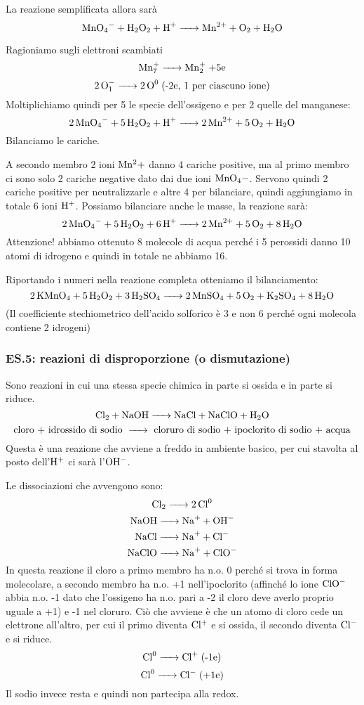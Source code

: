 La reazione semplificata allora sarà
$$\ce{MnO_4- + H_2O_2 + H+ -> Mn^2+ + O_2 + H_2O}$$

Ragioniamo sugli elettroni scambiati
$$\ce{Mn^+7 -> Mn^+2} \; \text{+5e}$$
$$\ce{2O^-1 -> 2O^0} \; \text{(-2e, 1 per ciascuno ione)}$$
Moltiplichiamo quindi per 5 le specie dell'ossigeno e per 2 quelle del manganese:
$$\ce{2MnO_4- + 5H_2O_2 + H+ -> 2Mn^2+ + 5O_2 + H_2O}$$
Bilanciamo le cariche.

A secondo membro 2 ioni $\rm Mn^2+$ danno 4 cariche positive, ma al primo membro ci sono solo 2 cariche negative dato dai due ioni $\rm MnO_4-$. Servono quindi 2 cariche positive per neutralizzarle e altre 4 per bilanciare, quindi aggiungiamo in totale 6 ioni $\rm H^+$. Possiamo bilanciare anche le masse, la reazione sarà:
$$\ce{2MnO_4- + 5H_2O_2 + 6H+ -> 2Mn^2+ + 5O_2 + 8H_2O}$$
Attenzione! abbiamo ottenuto 8 molecole di acqua perché i 5 perossidi danno 10 atomi di idrogeno e quindi in totale ne abbiamo 16.

Riportando i numeri nella reazione completa otteniamo il bilanciamento:
$$\ce{2KMnO_4 + 5H_2O_2 + 3H_2SO_4 -> 2MnSO_4 + 5O_2 + K_2SO_4 + 8H_2O}$$
(Il coefficiente stechiometrico dell'acido solforico è 3 e non 6 perché ogni molecola contiene 2 idrogeni)
\subsubsection{\textbf{ES.5: reazioni di disproporzione (o dismutazione)}}

Sono reazioni in cui una stessa specie chimica in parte si ossida e in parte si riduce.
$$\ce{Cl_2 + NaOH -> NaCl + NaClO + H_2O}$$
$$\text{cloro + idrossido di sodio \ce{->} cloruro di sodio + ipoclorito di sodio + acqua}$$
Questa è una reazione che avviene a freddo in ambiente basico, per cui stavolta al posto dell'$\rm H^+$ ci sarà l'$\rm OH^-$.

Le dissociazioni che avvengono sono:
$$\ce{Cl_2 -> 2Cl^0}$$
$$\ce{NaOH -> Na+ + OH-}$$
$$\ce{NaCl -> Na+ + Cl-}$$
$$\ce{NaClO -> Na+ + ClO-}$$
In questa reazione il cloro a primo membro ha n.o. 0 perché si trova in forma molecolare, a secondo membro ha n.o. +1 nell'ipoclorito (affinché lo ione $\rm ClO^-$ abbia n.o. -1 dato che l'ossigeno ha n.o. pari a -2 il cloro deve averlo proprio uguale a +1) e -1 nel cloruro. Ciò che avviene è che un atomo di cloro cede un elettrone all'altro, per cui il primo diventa $\rm Cl^+$ e si ossida, il secondo diventa $\rm Cl^-$ e si riduce.
$$\ce{Cl^0 -> Cl+} \; \text{(-1e)}$$
$$\ce{Cl^0 ->Cl-} \; \text{(+1e)}$$
Il sodio invece resta  e quindi non partecipa alla redox.

